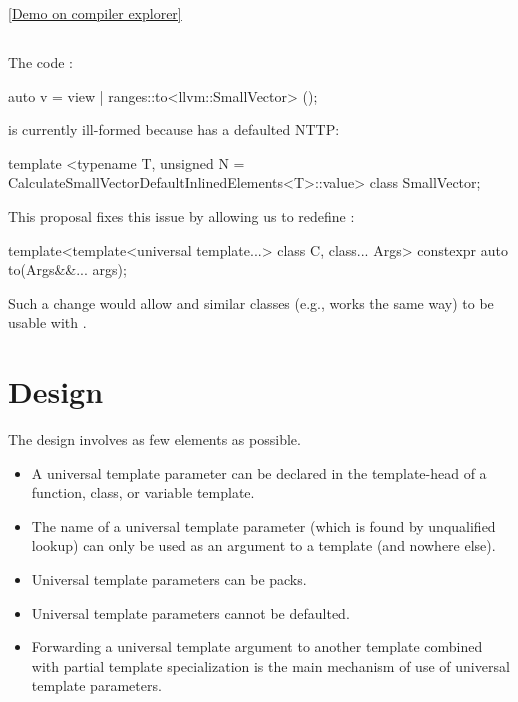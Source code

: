 \documentclass{wg21}
\begin{document}
\href{https://gcc.godbolt.org/z/z7n978vdv}{[Demo on compiler explorer]}

\subsection{}

The code :

\begin{colorblock}
auto v = view | ranges::to<llvm::SmallVector> ();
\end{colorblock}

is currently ill-formed because  has a defaulted NTTP:

\begin{colorblock}
template <typename T, unsigned N = CalculateSmallVectorDefaultInlinedElements<T>::value>
class SmallVector;
\end{colorblock}

This proposal fixes this issue by allowing us to redefine :

\begin{colorblock}
template<template<universal template...> class C, class... Args>
constexpr auto to(Args&&... args);
\end{colorblock}

Such a change would allow  and similar classes (e.g.,  works the same way) to be usable with .

\section{Design}

The design involves as few elements as possible.

\begin{itemize}
\item A universal template parameter can be declared in the template-head of a function, class, or variable template.
\item The name of a universal template parameter (which is found by unqualified lookup) can only be used as an argument to a template (and nowhere else).
\item Universal template parameters can be packs.
\item Universal template parameters cannot be defaulted.
\item Forwarding a universal template argument to another template combined with partial template specialization is the main mechanism of use of universal template parameters.
\end{itemize}
\end{document}
